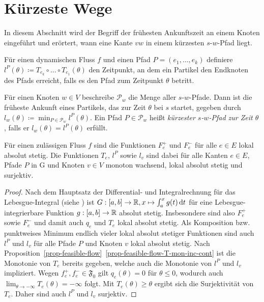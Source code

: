 \section{Kürzeste Wege}\label{sec-travel-times}

In diesem Abschnitt wird der Begriff der frühesten Ankunftszeit an einem Knoten eingeführt und erörtert, wann eine Kante $vw$ in einem kürzesten $s$-$w$-Pfad liegt.

\begin{definition}
	Für einen dynamischen Fluss $f$ und einen Pfad $P=(e_1,\dots,e_k)$ definiere $l^P(\theta)\coloneq T_{e_k}\circ\dots\circ T_{e_1}(\theta)$ den Zeitpunkt, an dem ein Partikel den Endknoten des Pfads erreicht, falls es den Pfad zum Zeitpunkt $\theta$ betritt.
	
	Für einen Knoten $w\in V$ beschreibe $\mathcal{P}_w$ die Menge aller $s$-$w$-Pfade.
	Dann ist die früheste Ankunft eines Partikels, das zur Zeit $\theta$ bei $s$ startet, gegeben durch $l_w(\theta)\coloneq \min_{P\in\mathcal{P}_w}l^P(\theta)$.
	Ein Pfad $P\in \mathcal{P}_w$ heißt \emph{kürzester $s$-$w$-Pfad zur Zeit $\theta$}, falls er $l_w(\theta)=l^P(\theta)$ erfüllt.
\end{definition}

\begin{proposition}\label{prop-abs-cont-sur}
	Für einen zulässigen Fluss $f$ sind die Funktionen $F_e^+$ und $F_e^-$ für alle $e\in E$ lokal absolut stetig.
	Die Funktionen $T_e$, $l^P$ sowie $l_v$ sind dabei für alle Kanten $e\in E$, Pfade $P$ in G und Knoten $v\in V$ monoton wachsend, lokal absolut stetig und surjektiv.
\end{proposition}
\begin{proof}
	Nach dem Hauptsatz der Differential- und Integralrechnung für das Lebes\-gue-Inte\-gral (siehe \cite[Kap. VII, Satz 4.14]{Elstrodt2011}) ist $G: [a,b] \to \mathbb{R}, x\mapsto \int_a^x g(t) \mathop{}\!\mathrm{d} t$ für eine Lebesgue-integrierbare Funktion $g: [a,b] \to \mathbb{R}$ absolut stetig.
	Insbesondere sind also $F_e^+$ sowie $F_e^-$ und damit auch $q_e$ und $T_e$ lokal absolut stetig.
	Als Komposition bzw. punktweises Minimum endlich vieler lokal absolut stetiger Funktionen sind auch $l^P$ und $l_v$ für alle Pfade $P$ und Knoten $v$ lokal absolut stetig.
	Nach Proposition~\ref{prop-feasible-flow}~\ref{prop-feasible-flow-T-mon-inc-cont} ist die Monotonie von $T_e$ bereits gegeben, welche auch die Monotonie von $l^P$ und $l_v$ impliziert.
	Wegen $f_e^+, f_e^-\in\mathfrak{F_0}$ gilt $q_e(\theta)=0$ für $\theta\leq 0$, wodurch auch $\lim_{\theta\to-\infty} T_e(\theta) = - \infty$ folgt.
	Mit $T_e(\theta)\geq \theta$ ergibt sich die Surjektivität von $T_e$.
	Daher sind auch $l^P$ und $l_v$ surjektiv.
\end{proof}

